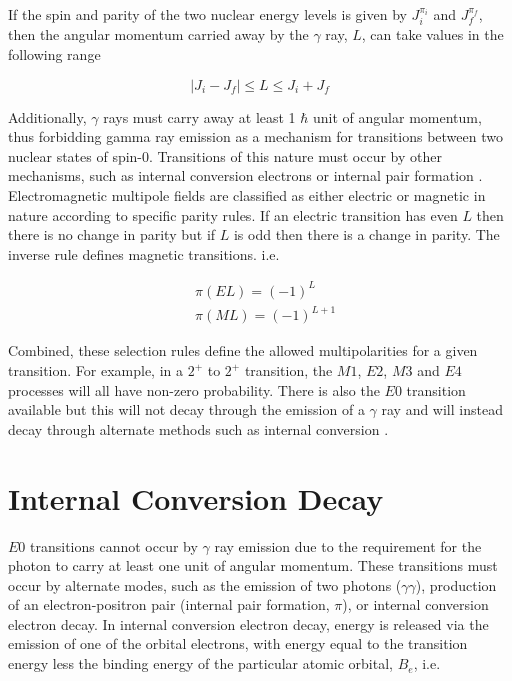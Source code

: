If the spin and parity of the two nuclear energy levels is given by $J^{\pi_i}_{i}$ and $J^{\pi_f}_{f}$, then the angular momentum carried away by the $\gamma$ ray, $L$, can take values in the following range

\begin{equation}
|J_i-J_f|\leq L \leq J_i+J_f
\label{equation: gamma ray decay vector difference}
\end{equation}

Additionally, $\gamma$ rays must carry away at least 1 $\hbar$ unit of angular momentum, thus forbidding gamma ray emission as a mechanism for transitions between two nuclear states of spin-0. Transitions of this nature must occur by other mechanisms, such as internal conversion electrons or internal pair formation \cite{KraneText}. 
Electromagnetic multipole fields are classified as either electric or magnetic in nature according to specific parity rules. If an electric transition has even $L$ then there is no change in parity but if $L$ is odd then there is a change in parity. The inverse rule defines magnetic transitions. i.e.

\begin{equation}
\begin{aligned}
&\pi(EL)=(-1)^{L} \\
&\pi(ML)=(-1)^{L+1}
\label{equation: gamma ray decay selection rules}
\end{aligned}
\end{equation}

Combined, these selection rules define the allowed multipolarities for a given transition. For example, in a $2^+$ to $2^+$ transition, the $M1$, $E2$, $M3$ and $E4$ processes will all have non-zero probability. There is also the $E0$ transition available but this will not decay through the emission of a $\gamma$ ray and will instead decay through alternate methods such as internal conversion \cite{KraneText}. 

\section{Internal Conversion Decay}

$E0$ transitions cannot occur by $\gamma$ ray emission due to the requirement for the photon to carry at least one unit of angular momentum. These transitions must occur by alternate modes, such as the emission of two photons ($\gamma \gamma$), production of an electron-positron pair (internal pair formation, $\pi$), or internal conversion electron decay.
In internal conversion electron decay, energy is released via the emission of one of the orbital electrons, with energy equal to the transition energy less the binding energy of the particular atomic orbital, $B_e$, i.e.

